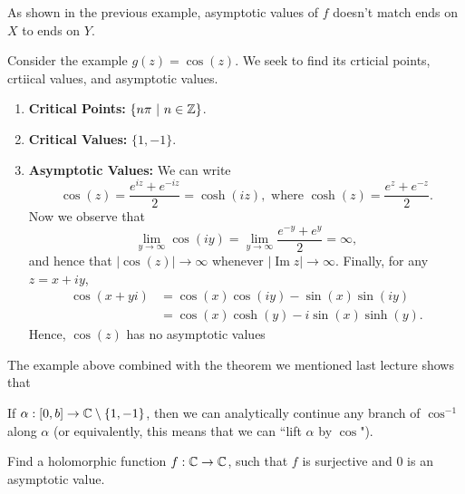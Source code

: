 \documentclass{article}
\begin{document}
{\begin{remark}
    As shown in the previous example, asymptotic values of $f$ doesn't match ends on $X$ to ends on $Y$.
\end{remark}

\begin{example}
    Consider the example $g(z) = \cos (z)$. We seek to find its crticial points, crtiical values, and asymptotic values.
    \begin{enumerate}
        \item \textbf{Critical Points:} $\{n \pi \ |\ n \in \mathbb{Z}\}$.
        \item \textbf{Critical Values:} $\{1, -1\}$.
        \item \textbf{Asymptotic Values:} We can write
        \[\cos(z) = \frac{e^{iz} + e^{-iz}}{2} = \cosh(iz), \text{ where } \cosh(z) = \frac{e^z + e^{-z}}{2}.\]
        Now we observe that
        \[\lim_{y \to \infty} \cos(iy) = \lim_{y \to \infty} \frac{e^{-y} + e^y}{2} = \infty,\]
        and hence that $|\cos(z)| \to \infty$ whenever $|\operatorname{Im} z| \to \infty$. Finally, for any $z = x + iy$,
        \begin{align*}
            \cos(x + yi) &= \cos(x) \cos(iy) - \sin(x) \sin(iy)\\
            &= \cos(x) \cosh(y) - i \sin(x) \sinh(y).
        \end{align*}
        Hence, $\cos(z)$ has no asymptotic values 
    \end{enumerate}
\end{example}

The example above combined with the theorem we mentioned last lecture shows that
\begin{theorem}
    If $\alpha: [0, b] \to \mathbb{C} \setminus \{1, -1\}$, then we can analytically continue any branch of $\cos^{-1}$ along $\alpha$ (or equivalently, this means that we can ``lift $\alpha$ by $\cos$").
\end{theorem}

\begin{exercise}
    Find a holomorphic function $f: \mathbb{C} \to \mathbb{C}$, such that $f$ is surjective and $0$ is an asymptotic value.
\end{exercise}

}
\end{document}
